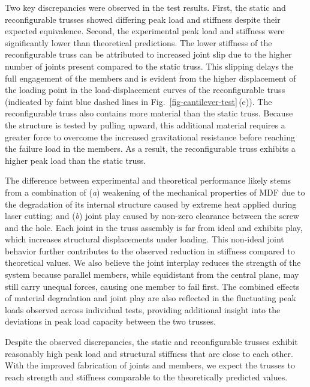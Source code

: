 Two key discrepancies were observed in the test results. First, the static and reconfigurable trusses showed differing peak load and stiffness despite their expected equivalence. Second, the experimental peak load and stiffness were significantly lower than theoretical predictions. The lower stiffness of the reconfigurable truss can be attributed to increased joint slip due to the higher number of joints present compared to the static truss. This slipping delays the full engagement of the members and is evident from the higher displacement of the loading point in the load-displacement curves of the reconfigurable truss (indicated by faint blue dashed lines in Fig.~\ref{fig-cantilever-test}\,(e)). The reconfigurable truss also contains more material than the static truss. Because the structure is tested by pulling upward, this additional material requires a greater force to overcome the increased gravitational resistance before reaching the failure load in the members. As a result, the reconfigurable truss exhibits a higher peak load than the static truss.  

The difference between experimental and theoretical performance likely stems from a combination of (\textit{a}) weakening of the mechanical properties of MDF due to the degradation of its internal structure caused by extreme heat applied during laser cutting\citep{lum2000laser, mushtaq2020laser}; and (\textit{b}) joint play caused by non-zero clearance between the screw and the hole. Each joint in the truss assembly is far from ideal and exhibits play, which increases structural displacements under loading. This non-ideal joint behavior further contributes to the observed reduction in stiffness compared to theoretical values. We also believe the joint interplay reduces the strength of the system because parallel members, while equidistant from the central plane, may still carry unequal forces, causing one member to fail first. The combined effects of material degradation and joint play are also reflected in the fluctuating peak loads observed across individual tests, providing additional insight into the deviations in peak load capacity between the two trusses.

Despite the observed discrepancies, the static and reconfigurable trusses exhibit reasonably high peak load and structural stiffness that are close to each other. With the improved fabrication of joints and members, we expect the trusses to reach strength and stiffness comparable to the theoretically predicted values.

